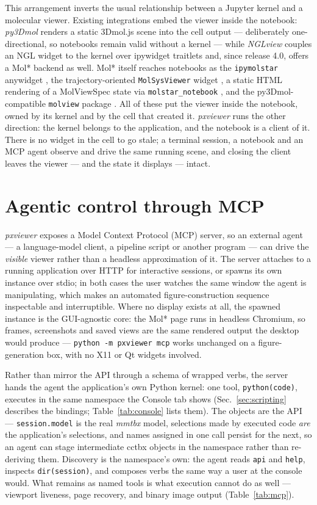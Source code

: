 \documentclass[11pt]{article}
\newcommand{\pxviewer}{\emph{pxviewer}}
\begin{document}
This arrangement inverts the usual relationship between a Jupyter kernel
and a molecular viewer. Existing integrations embed the viewer inside the
notebook: \emph{py3Dmol} \citep{py3dmol2015} renders a static 3Dmol.js
scene into the cell output --- deliberately one-directional, so notebooks
remain valid without a kernel --- while \emph{NGLview}
\citep{nglview2018} couples an NGL widget to the kernel over ipywidget
traitlets and, since release 4.0, offers a Mol* backend as well. Mol*
itself reaches notebooks as the \texttt{ipymolstar} anywidget
\citep{ipymolstar}, the trajectory-oriented \texttt{MolSysViewer} widget
\citep{molsysviewer}, a static HTML rendering of a MolViewSpec state via
\texttt{molstar\_notebook} \citep{mvs2025}, and the py3Dmol-compatible
\texttt{molview} package \citep{molview}. All of these put the viewer
inside the notebook, owned by its kernel and by the cell that created it.
\pxviewer{} runs the other direction: the kernel belongs to the
application, and the notebook is a client of it. There is no widget in
the cell to go stale; a terminal session, a notebook and an MCP agent
observe and drive the same running scene, and closing the client leaves
the viewer --- and the state it displays --- intact.

\section{Agentic control through MCP}
\label{sec:mcp}

\pxviewer{} exposes a Model Context Protocol (MCP) server, so an external
agent --- a language-model client, a pipeline script or another program ---
can drive the \emph{visible} viewer rather than a headless approximation of
it. The server attaches to a running application over HTTP for interactive
sessions, or spawns its own instance over stdio; in both cases the user
watches the same window the agent is manipulating, which makes an automated
figure-construction sequence inspectable and interruptible. Where no display
exists at all, the spawned instance is the GUI-agnostic core: the Mol* page
runs in headless Chromium, so frames, screenshots and saved views are the
same rendered output the desktop would produce --- \texttt{python -m
pxviewer mcp} works unchanged on a figure-generation box, with no X11 or Qt
widgets involved.

Rather than mirror the API through a schema of wrapped verbs, the server
hands the agent the application's own Python kernel: one tool,
\texttt{python(code)}, executes in the same namespace the Console tab
shows (Sec.~\ref{sec:scripting} describes the bindings;
Table~\ref{tab:console} lists them). The objects are the API --- \texttt{session.model} is the
real \emph{mmtbx} model, selections made by executed code \emph{are} the
application's selections, and names assigned in one call persist for the
next, so an agent can stage intermediate cctbx objects in the namespace
rather than re-deriving them. Discovery is the namespace's own: the agent
reads \texttt{api} and \texttt{help}, inspects \texttt{dir(session)}, and
composes verbs the same way a user at the console would. What remains as
named tools is what execution cannot do as well --- viewport liveness,
page recovery, and binary image output (Table~\ref{tab:mcp}).
\end{document}
